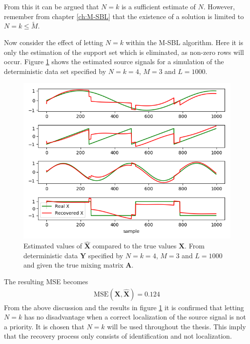 From this it can be argued that $N = k$ is a sufficient estimate of $N$. 
However, remember from chapter \ref{ch:M-SBL} that the existence of a solution is limited to $N = k \leq \widetilde{M}$.

Now consider the effect of letting $N = k$ within the M-SBL algorithm. 
Here it is only the estimation of the support set which is eliminated, as non-zero rows will occur. 
Figure \ref{fig:M-SBL_simple3} shows the estimated source signals for a simulation of the deterministic data set specified by $N = k = 4$, $M = 3$ and $L = 1000$. 
\begin{figure}[H]
\centering
\includegraphics[scale=0.5]{figures/ch_6/M-SBL_simple3.png}
\caption{Estimated values of $\hat{\textbf{X}}$ compared to the true 				values $\textbf{X}$. From deterministic data $\textbf{Y}$ specified by $N=k=4$, $M = 3$ and $L=1000$ and given the true mixing matrix $\mathbf{A}$.}
\label{fig:M-SBL_simple3}
\end{figure}
\noindent
The resulting MSE becomes
\begin{align*}
\text{MSE}(\mathbf{X}, \hat{\mathbf{X}}) = 0.124
\end{align*}
From the above discussion and the results in figure \ref{fig:M-SBL_simple3} it is confirmed that letting $N = k$ has no disadvantage when a correct localization of the source signal is not a priority. 
It is chosen that $N = k$ will be used throughout the thesis. This imply that the recovery process only consists of identification and not localization. 

